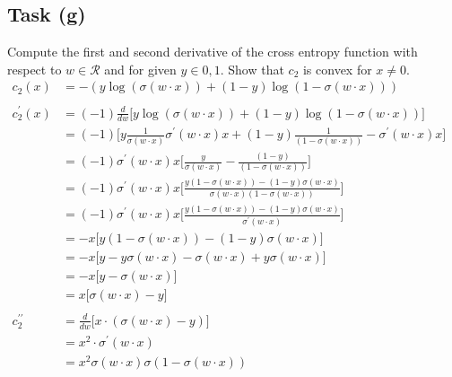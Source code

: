 \documentclass[onecolumn]{article}
\begin{document}
\subsection{Task (g)}
Compute the first and second derivative of the cross entropy function with respect to $w \in \mathcal{R}$ and for given $y \in {0,1}$. Show that $c_2$ is convex for $x \neq 0$.
\begin{align*}
	c_2(x) &= -(y \log(\sigma(w \cdot x)) + (1-y)\log(1-\sigma(w \cdot x))) && \\
	\\
	c_2^{\prime}(x) &= (-1) \frac{d}{dw} \Big[y \log(\sigma(w \cdot x)) + (1-y)\log(1-\sigma(w \cdot x))\Big] && \\
	&= (-1) \Big[y \frac{1}{\sigma(w \cdot x)} \sigma^\prime(w \cdot x) x + (1-y) \frac{1}{(1-\sigma(w \cdot x))} -\sigma^\prime(w \cdot x) x\Big] && \\
	&= (-1) \sigma^\prime(w \cdot x)x\Big[\frac{y}{\sigma(w \cdot x)} - \frac{(1-y)}{(1-\sigma(w \cdot x))} \Big] && \\
	&= (-1) \sigma^\prime(w \cdot x)x\Big[\frac{y (1-\sigma(w \cdot x)) - (1-y)\sigma(w \cdot x)}{\sigma(w \cdot x)(1-\sigma(w \cdot x))}\Big] && \\
	&= (-1) \sigma^\prime(w \cdot x)x\Big[\frac{y (1-\sigma(w \cdot x)) - (1-y)\sigma(w \cdot x)}{\sigma^\prime(w \cdot x)}\Big] && \\
	&= -x \Big[y (1-\sigma(w \cdot x)) - (1-y)\sigma(w \cdot x)\Big] && \\
	&= -x \Big[y - y\sigma(w \cdot x) - \sigma(w \cdot x) + y\sigma(w \cdot x)\Big] && \\
	&= -x \Big[y - \sigma(w \cdot x)\Big] && \\
	&= x \Big[\sigma(w \cdot x) - y\Big] && \\
	\\
	c_2^{\prime\prime} &= \frac{d}{dw} \Big[x \cdot (\sigma(w \cdot x) - y)\Big] && \\
	&= x^2 \cdot \sigma^\prime(w \cdot x) && \\
	&= x^2 \sigma(w \cdot x) \sigma(1 - \sigma(w \cdot x))
\end{align*}
\end{document}
